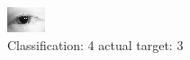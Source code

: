 \begin{figure}[h!]
\begin{center}
\includegraphics[width=0.60\columnwidth]{figures/ID87_class_4_target_3.png}
\end{center}
\caption{ Classification: 4 actual target: 3}
\label{fig:ID87_class_4_target_3}
\end{figure}
